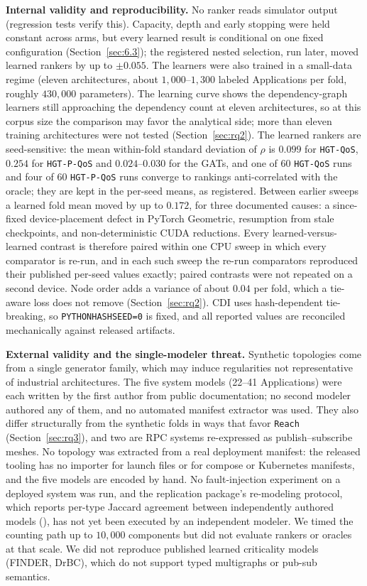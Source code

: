 \documentclass[preprint,3p]{elsarticle}
\begin{document}
\noindent\textbf{Internal validity and reproducibility.} No ranker reads simulator output (regression tests verify this). Capacity, depth and early stopping were held constant across arms, but every learned result is conditional on one fixed configuration (Section~\ref{sec:6.3}); the registered nested selection, run later, moved learned rankers by up to $\pm 0.055$. The learners were also trained in a small-data regime (eleven architectures, about $1{,}000$--$1{,}300$ labeled Applications per fold, roughly $430{,}000$ parameters). The learning curve shows the dependency-graph learners still approaching the dependency count at eleven architectures, so at this corpus size the comparison may favor the analytical side; more than eleven training architectures were not tested (Section~\ref{sec:rq2}). The learned rankers are seed-sensitive: the mean within-fold standard deviation of $\rho$ is $0.099$ for \texttt{HGT-QoS}, $0.254$ for \texttt{HGT-P-QoS} and $0.024$--$0.030$ for the GATs, and one of 60 \texttt{HGT-QoS} runs and four of 60 \texttt{HGT-P-QoS} runs converge to rankings anti-correlated with the oracle; they are kept in the per-seed means, as registered. Between earlier sweeps a learned fold mean moved by up to $0.172$, for three documented causes: a since-fixed device-placement defect in PyTorch Geometric, resumption from stale checkpoints, and non-deterministic CUDA reductions. Every learned-versus-learned contrast is therefore paired within one CPU sweep in which every comparator is re-run, and in each such sweep the re-run comparators reproduced their published per-seed values exactly; paired contrasts were not repeated on a second device. Node order adds a variance of about $0.04$ per fold, which a tie-aware loss does not remove (Section~\ref{sec:rq2}). CDI uses hash-dependent tie-breaking, so \texttt{PYTHONHASHSEED=0} is fixed, and all reported values are reconciled mechanically against released artifacts.

\noindent\textbf{External validity and the single-modeler threat.} Synthetic topologies come from a single generator family, which may induce regularities not representative of industrial architectures. The five system models (22--41 Applications) were each written by the first author from public documentation; no second modeler authored any of them, and no automated manifest extractor was used. They also differ structurally from the synthetic folds in ways that favor \texttt{Reach} (Section~\ref{sec:rq3}), and two are RPC systems re-expressed as publish--subscribe meshes. No topology was extracted from a real deployment manifest: the released tooling has no importer for launch files or for compose or Kubernetes manifests, and the five models are encoded by hand. No fault-injection experiment on a deployed system was run, and the replication package's re-modeling protocol, which reports per-type Jaccard agreement between independently authored models (), has not yet been executed by an independent modeler. We timed the counting path up to $10{,}000$ components but did not evaluate rankers or oracles at that scale. We did not reproduce published learned criticality models (FINDER, DrBC), which do not support typed multigraphs or pub-sub semantics.
\end{document}
